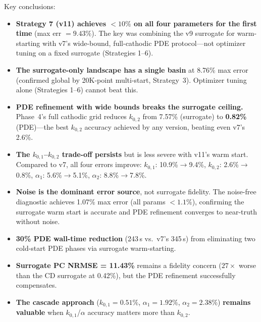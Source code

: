 \documentclass[11pt]{article}
\begin{document}
Key conclusions:
\begin{itemize}
  \item \textbf{Strategy 7 (v11) achieves $<10\%$ on all four parameters for
        the first time} (max err $= 9.43\%$).  The key was combining the v9
        surrogate for warm-starting with v7's wide-bound, full-cathodic PDE
        protocol---not optimizer tuning on a fixed surrogate (Strategies 1--6).

  \item \textbf{The surrogate-only landscape has a single basin} at 8.76\% max
        error (confirmed global by 20K-point multi-start, Strategy~3).
        Optimizer tuning alone (Strategies 1--6) cannot beat this.

  \item \textbf{PDE refinement with wide bounds breaks the surrogate ceiling.}
        Phase~4's full cathodic grid reduces $k_{0,2}$ from 7.57\% (surrogate)
        to \textbf{0.82\%} (PDE)---the best $k_{0,2}$ accuracy achieved by any
        version, beating even v7's 2.6\%.

  \item \textbf{The $k_{0,1}$--$k_{0,2}$ trade-off persists} but is less severe
        with v11's warm start.  Compared to v7, all four errors improve:
        $k_{0,1}$: 10.9\%$\to$9.4\%,
        $k_{0,2}$: 2.6\%$\to$0.8\%,
        $\alpha_1$: 5.6\%$\to$5.1\%,
        $\alpha_2$: 8.8\%$\to$7.8\%.

  \item \textbf{Noise is the dominant error source}, not surrogate fidelity.
        The noise-free diagnostic achieves 1.07\% max error (all params $<1.1\%$),
        confirming the surrogate warm start is accurate and PDE refinement
        converges to near-truth without noise.

  \item \textbf{30\% PDE wall-time reduction} (243\,s vs.\ v7's 345\,s) from
        eliminating two cold-start PDE phases via surrogate warm-starting.

  \item \textbf{Surrogate PC NRMSE = 11.43\%} remains a fidelity concern
        ($27\times$ worse than the CD surrogate at 0.42\%), but the PDE
        refinement successfully compensates.

  \item \textbf{The cascade approach} ($k_{0,1} = 0.51\%$,
        $\alpha_1 = 1.92\%$, $\alpha_2 = 2.38\%$) \textbf{remains valuable}
        when $k_{0,1}$/$\alpha$ accuracy matters more than $k_{0,2}$.
\end{itemize}
\end{document}

